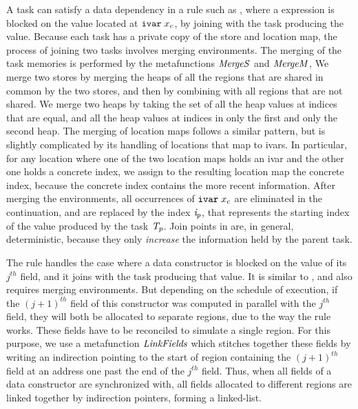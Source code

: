 \documentclass[acmsmall,acmthm=false,nonacm]{acmart}
\theoremstyle{straighttext0}
\theoremstyle{straighttext}
\newcommand{\Figref}[1]{Figure~\ref{#1}}
\begin{document}
{%
%
A task can satisfy a data dependency in a rule such as
\dregparcasejoin{}, where a  expression is blocked
%
on the value
located at $\texttt{ivar}\; x_c$, by joining with the task producing the value.
%
Because each task has a private copy of the store and location map,
the process of joining two tasks involves merging environments.
%
The merging of the task memories is performed by the metafunctions $\mathit{MergeS}$ and $\mathit{MergeM}$,
\iftoggle{EXTND}{
  defined formally in Appendix~\ref{subsec:appendix-merging-memories-region-parallel}.
}{
  defined formally in the Appendix of the extended version~\cite{ParallelLoCal-tr}.
}
%
We merge two stores by merging the heaps of all the regions that are
shared in common by the two stores, and then by combining with all
regions that are not shared.
%
We merge two heaps by taking the set of all the heap values at
indices that are equal, and all the heap values at
indices in only the first and only the second heap.
%
The merging of location maps follows a similar pattern, but is slightly
complicated by its handling of locations that map to ivars.
%
In particular, for any location where one of the two location maps
holds an ivar and the other one holds a concrete index, we assign
to the resulting location map the concrete index, because the concrete
index contains the more recent information.
%
After merging the environments, all occurrences of
$\texttt{ivar}\; x_c$ are eliminated in the continuation,
and are replaced by the index $\mathit{i}_p$,
that represents the starting index of the value produced by the task $\mathit{T}_p$.
%
Join points in \rparcalc{} are, in general, deterministic, because they only
{\em increase} the information held by the parent task.

The rule \dregpardataconjoin{} handles the case where a data constructor
is blocked on the value of its $j^{th}$ field, and it joins with the task
producing that value.
%
It is similar to \dregparcasejoin{}, and also requires merging environments.
%
But depending on the schedule of execution,
if the $(j+1)^{th}$ field of this constructor was computed in parallel
with the $j^{th}$ field, they will both be allocated to separate regions,
due to the way the rule \dregparletlocafternewreg{} works.
%
These fields have to be reconciled to simulate a single region.
%
For this purpose, we use a metafunction $\mathit{LinkFields}$
\iftoggle{EXTND}{
  --- defined formally in Appendix~\ref{subsec:appendix-linking-fields} ---
}{
  --- defined formally in the Appendix of the extended version~\cite{ParallelLoCal-tr} ---
}
which stitches together these fields
by writing an indirection pointing to the start of region containing the $(j+1)^{th}$ field
at an address one past the end of the $j^{th}$ field.
%
Thus, when all fields of a data constructor are synchronized with, all fields allocated
to different regions are linked together by indirection pointers,
forming a linked-list.

}
\end{document}
